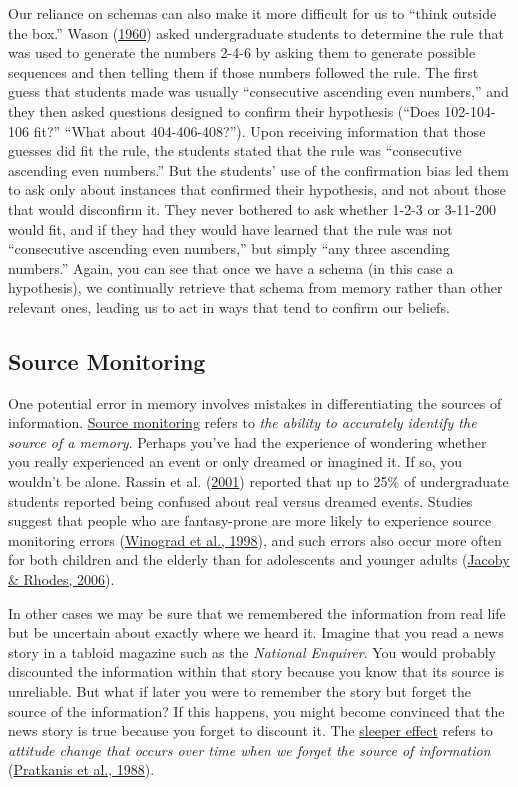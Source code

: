 \documentclass[
]{krantz}
\begin{document}
Our reliance on schemas can also make it more difficult for us to ``think outside the box.'' Wason (\protect\hyperlink{ref-Wason1960}{1960}) asked undergraduate students to determine the rule that was used to generate the numbers 2-4-6 by asking them to generate possible sequences and then telling them if those numbers followed the rule. The first guess that students made was usually ``consecutive ascending even numbers,'' and they then asked questions designed to confirm their hypothesis (``Does 102-104-106 fit?'' ``What about 404-406-408?''). Upon receiving information that those guesses did fit the rule, the students stated that the rule was ``consecutive ascending even numbers.'' But the students' use of the confirmation bias led them to ask only about instances that confirmed their hypothesis, and not about those that would disconfirm it. They never bothered to ask whether 1-2-3 or 3-11-200 would fit, and if they had they would have learned that the rule was not ``consecutive ascending even numbers,'' but simply ``any three ascending numbers.'' Again, you can see that once we have a schema (in this case a hypothesis), we continually retrieve that schema from memory rather than other relevant ones, leading us to act in ways that tend to confirm our beliefs.

\hypertarget{source-monitoring}{%
\subsection*{Source Monitoring}\label{source-monitoring}}


One potential error in memory involves mistakes in differentiating the sources of information. \protect\hyperlink{source-monitoring}{Source monitoring} refers to \emph{the ability to accurately identify the source of a memory}. Perhaps you've had the experience of wondering whether you really experienced an event or only dreamed or imagined it. If so, you wouldn't be alone. Rassin et al. (\protect\hyperlink{ref-Rassin2001}{2001}) reported that up to 25\% of undergraduate students reported being confused about real versus dreamed events. Studies suggest that people who are fantasy-prone are more likely to experience source monitoring errors (\protect\hyperlink{ref-Winograd1998}{Winograd et al., 1998}), and such errors also occur more often for both children and the elderly than for adolescents and younger adults (\protect\hyperlink{ref-jacoby2006false}{Jacoby \& Rhodes, 2006}).

In other cases we may be sure that we remembered the information from real life but be uncertain about exactly where we heard it. Imagine that you read a news story in a tabloid magazine such as the \emph{National Enquirer}. You would probably discounted the information within that story because you know that its source is unreliable. But what if later you were to remember the story but forget the source of the information? If this happens, you might become convinced that the news story is true because you forget to discount it. The \protect\hyperlink{sleeper-effect}{sleeper effect} refers to \emph{attitude change that occurs over time when we forget the source of information} (\protect\hyperlink{ref-Pratkanis1988}{Pratkanis et al., 1988}).
\end{document}
